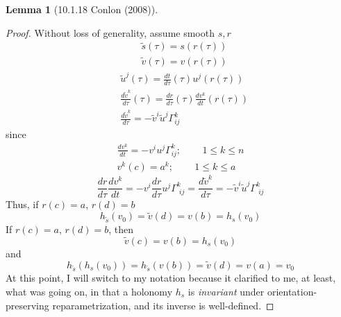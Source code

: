 \documentclass[10pt]{amsart}
\newtheorem{lemma}{Lemma}
\begin{document}
\begin{multicols*}{2}
\begin{lemma}[10.1.18 Conlon (2008)\cite{Conl2008}]
\end{lemma}
\begin{proof}
	Without loss of generality,  assume smooth $s,r$
\[
\begin{aligned}
	& \widetilde{s}(\tau) = s(r(\tau)) \\ 
	& \widetilde{v}(\tau) = v(r(\tau))
\end{aligned}
\]
\[
\begin{aligned}
	& \widetilde{u}^j(\tau) = \frac{dt}{d\tau}(\tau) u^j(r(\tau)) \\ 
	& \frac{d\widetilde{v}^k}{d\tau} (\tau) = \frac{dr}{d\tau}(\tau) \frac{dv^k}{dt}(r(\tau)) \\ 
	& \frac{d\widetilde{v}^k }{ d\tau} = -\widetilde{v}^i \widetilde{u}^j \Gamma^k_{ij} 
\end{aligned}
\]
since \[
\begin{gathered}
	\frac{dv^k}{dt} = -v^i u^j \Gamma^k_{ij} ; \qquad \, 1\leq k \leq n \\ 
v^k(c) = a^k; \qquad \, 1\leq k \leq a 
\end{gathered}
\]
\[
\frac{dr}{d\tau} \frac{dv^k}{ dt} = -v^i \frac{dr}{d\tau} u^j \Gamma^k_{ \, \, ij} = \frac{d\widetilde{v}^k}{d\tau} = -\widetilde{v}^i \widetilde{u}^j \Gamma^k_{ \, \, ij}
\]
Thus, if $r(c) = a$, $r(d)=b$
\[
h_{\widetilde{s}}(v_0) = \widetilde{v}(d) = v(b) = h_s(v_0)
\]
If $r(c)=a$, $r(d)=b$, then 
\[
\widetilde{v}(c) = v(b) = h_s(v_0)
\]
and 
\[
h_{\widetilde{s}}(h_s(v_0)) = h_{\widetilde{s}}(v(b)) = \widetilde{v}(d) = v(a) = v_0
\]
At this point, I will switch to my notation because it clarified to me, at least, what was going on, in that a holonomy $h_s$ is \emph{invariant} under orientation-preserving reparametrization, and its inverse is well-defined.  


\end{proof}
\end{multicols*}
\end{document}
